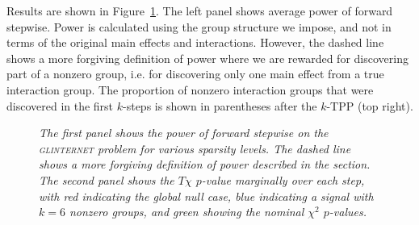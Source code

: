 \documentclass{imsart}
\begin{document}
Results are shown in Figure~\ref{fig:glint}. The left
panel shows average power of forward stepwise. Power is calculated
using the group structure we impose, and not in terms of the original
main effects and interactions. However, the dashed line shows a more
forgiving definition of power where we are rewarded for discovering part
of a nonzero group, i.e. for discovering only one main effect from a
true interaction group. The proportion of nonzero interaction groups
that were discovered in the first $k$-steps is shown in parentheses
after the $k$-TPP (top right).

\begin{figure}[!htp]
\begin{center}
\hspace{-15pt}
\caption{\small \it The first panel shows the power of forward stepwise
on the \textsc{glinternet} problem
for various sparsity levels. The dashed line shows a more forgiving
definition of power described in the section.
The second panel shows the $T\chi$ $p$-value marginally
over each step, with red indicating the global null case, blue
indicating a signal with $k=6$ nonzero groups, and green showing
the nominal $\chi^2$ $p$-values.}
\label{fig:glint}
\end{center}
\end{figure}
\end{document}
